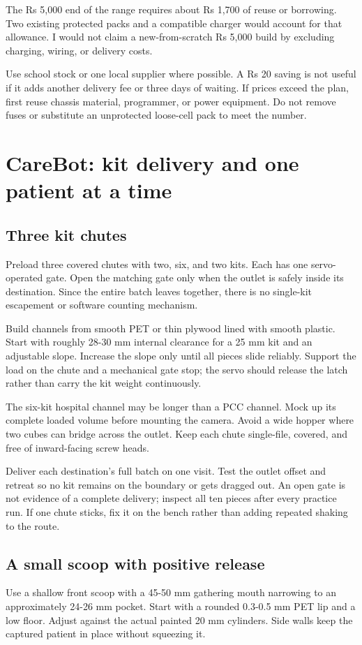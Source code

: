 \documentclass[10pt,a4paper]{article}
\begin{document}
The Rs 5,000 end of the range requires about Rs 1,700 of reuse or borrowing. Two existing protected packs and a compatible charger would account for that allowance. I would not claim a new-from-scratch Rs 5,000 build by excluding charging, wiring, or delivery costs.

Use school stock or one local supplier where possible. A Rs 20 saving is not useful if it adds another delivery fee or three days of waiting. If prices exceed the plan, first reuse chassis material, programmer, or power equipment. Do not remove fuses or substitute an unprotected loose-cell pack to meet the number.

\section{CareBot: kit delivery and one patient at a time}
\subsection{Three kit chutes}
Preload three covered chutes with two, six, and two kits. Each has one servo-operated gate. Open the matching gate only when the outlet is safely inside its destination. Since the entire batch leaves together, there is no single-kit escapement or software counting mechanism.

Build channels from smooth PET or thin plywood lined with smooth plastic. Start with roughly 28-30 mm internal clearance for a 25 mm kit and an adjustable slope. Increase the slope only until all pieces slide reliably. Support the load on the chute and a mechanical gate stop; the servo should release the latch rather than carry the kit weight continuously.

The six-kit hospital channel may be longer than a PCC channel. Mock up its complete loaded volume before mounting the camera. Avoid a wide hopper where two cubes can bridge across the outlet. Keep each chute single-file, covered, and free of inward-facing screw heads.

Deliver each destination's full batch on one visit. Test the outlet offset and retreat so no kit remains on the boundary or gets dragged out. An open gate is not evidence of a complete delivery; inspect all ten pieces after every practice run. If one chute sticks, fix it on the bench rather than adding repeated shaking to the route.

\subsection{A small scoop with positive release}
Use a shallow front scoop with a 45-50 mm gathering mouth narrowing to an approximately 24-26 mm pocket. Start with a rounded 0.3-0.5 mm PET lip and a low floor. Adjust against the actual painted 20 mm cylinders. Side walls keep the captured patient in place without squeezing it.
\end{document}
